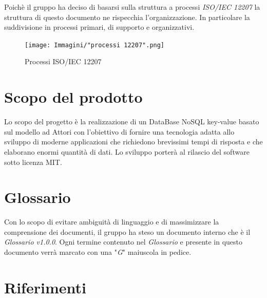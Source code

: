 \documentclass[a4paper]{report}
\begin{document}
	Poichè il gruppo ha deciso di basarsi sulla struttura a processi \emph{ISO/IEC 12207} la struttura di questo documento ne rispecchia 
	l'organizzazione. In particolare la suddivisione in processi primari, di supporto e organizzativi.
	\begin{figure}[h!]
		\centering
		\texttt{[image: Immagini/"processi 12207".png]}
		\caption{Processi ISO/IEC 12207}
	\end{figure}
	\section{Scopo del prodotto}
	Lo scopo del progetto è la realizzazione di un DataBase NoSQL key-value basato sul modello ad Attori con l'obiettivo di fornire una 
	tecnologia adatta allo sviluppo di moderne applicazioni che richiedono brevissimi tempi di risposta e che elaborano enormi quantità 
	di dati. Lo sviluppo porterà al rilascio del software sotto licenza MIT.
	\section{Glossario}
	Con lo scopo di evitare ambiguità di linguaggio e di massimizzare la comprensione dei documenti, il gruppo ha steso un documento 
	interno che è il \emph{Glossario v1.0.0}. Ogni termine contenuto nel \emph{Glossario} e presente in questo documento verrà marcato 
	con una "\textit{G}" maiuscola in pedice.
	\section{Riferimenti}
\end{document}
